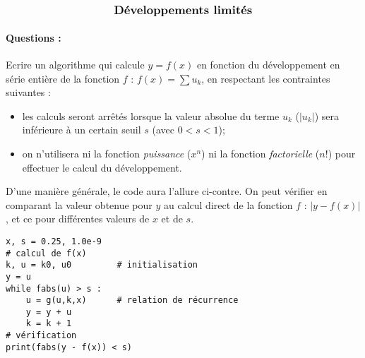 \documentclass[11pt,a4paper]{article}
\begin{document}
$$\mbox{\textbf{\large Développements limités}}$$

\paragraph{Questions :} 
Ecrire un algorithme qui calcule $y = f(x)$ en fonction du développement en série entière de la fonction $f$ : 
$f(x) = \sum u_k$, en respectant les contraintes suivantes :
\begin{itemize}
\item les calculs seront arrêtés lorsque la valeur absolue du terme $u_k$ ($|u_k|$) 
	sera inférieure à un certain seuil $s$ (avec $0 < s < 1$);
\item on n'utilisera ni la fonction \emph{puissance} ($x^n$) ni la fonction
	\emph{facto\-riel\-le} ($n!$) pour effectuer le calcul du développement.
\end{itemize}
\vspace*{5mm}

\noindent\begin{minipage}{6cm}
D'une manière générale, le code aura l'allure ci-contre.
On peut vérifier en comparant la valeur obtenue pour $y$
au calcul direct de la fonction $f$ : $|y - f(x)|$, et ce 
pour différentes valeurs de $x$ et de $s$.
\end{minipage}
\hfill
\begin{minipage}{9cm}\footnotesize
\begin{Verbatim}[frame=single]
x, s = 0.25, 1.0e-9
# calcul de f(x)
k, u = k0, u0         # initialisation
y = u
while fabs(u) > s :
    u = g(u,k,x)      # relation de récurrence
    y = y + u
    k = k + 1
# vérification
print(fabs(y - f(x)) < s)
\end{Verbatim}
\end{minipage}
\vspace*{5mm}
\end{document}
